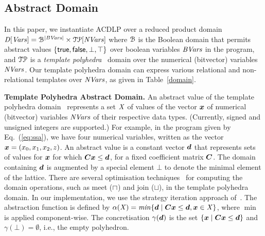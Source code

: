 \subsection{Abstract Domain}
In this paper, we instantiate ACDLP over a reduced product domain~\cite{CC79}
$\mathit{D}[\mathit{Vars}]=\mathcal{B}^{|\mathit{BVars}|}\times\mathcal{TP}[\mathit{NVars}]$ where
$\mathcal{B}$ is the Boolean domain that permits abstract values
$\{\mathsf{true},\mathsf{false},\bot,\top\}$ over boolean variables $\mathit{BVars}$ in the
program, and $\mathcal{TP}$ is a \textit{template polyhedra}~\cite{vmcai05}
domain over the numerical (bitvector) variables $\mathit{NVars}$.  Our template
polyhedra domain can express various relational and non-relational templates
over $\mathit{NVars}$, as given in Table~\ref{domain}.

\bigskip

\noindent\textbf{Template Polyhedra Abstract Domain.}
An abstract value of the template polyhedra domain~\cite{vmcai05}
represents a set $\mathit{X}$ of values of the vector ${\boldsymbol {x}}$ 
of numerical (bitvector) variables $\mathit{NVars}$ of their respective
data types. (Currently, signed and unsigned integers are supported.)
For example, in the program given by Eq.~(\ref{eq:ssa}), we have four 
numerical variables, written as the vector ${\boldsymbol {x}} = (x_0,x_1,x_2,z)$.  
An abstract value is a constant vector ${\boldsymbol {d}}$ that represents 
sets of values for ${\boldsymbol {x}}$ for which 
${\boldsymbol C}{\boldsymbol {x}}\leq{\boldsymbol {d}}$, for a fixed coefficient 
matrix ${\boldsymbol C}$.  The domain containing ${\boldsymbol {d}}$ is augmented 
by a special element $\bot$ to denote the minimal element of the lattice.  
%
There are several optimisation techniques~\cite{vmcai05} for computing the domain operations, 
such as meet ($\sqcap$) and join ($\sqcup$), in the template polyhedra domain.  
In our implementation, we use the strategy iteration approach of~\cite{BJKS15}.
%
The abstraction function is defined by $\alpha(\mathit{X}) = \mathit{min} \{{\boldsymbol {d}}\mid
{\boldsymbol C}{\boldsymbol {x}}\leq{\boldsymbol {d}}, {\boldsymbol {x}}\in \mathit{X}\}$, where 
$\min$ is applied component-wise.  The concretisation $\gamma({\boldsymbol {d}})$ is the set $\{{\boldsymbol {x}}\mid
{\boldsymbol C}{\boldsymbol {x}}\leq{\boldsymbol {d}}\}$ and $\gamma(\bot)=\emptyset$,
i.e., the empty polyhedron.

